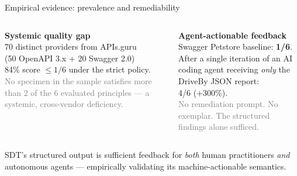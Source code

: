 \documentclass[11pt,aspectratio=169]{beamer}
\begin{document}
\begin{frame}{Empirical evidence: prevalence and remediability}

\begin{columns}[T,onlytextwidth]

\textbf{\textcolor{sdtblue}{Systemic quality gap}}\\[0.4em]
\footnotesize
70 distinct providers from APIs.guru\\
(50 OpenAPI 3.x + 20 Swagger 2.0)\\[0.4em]
\alert{84\% score $\leq 1/6$ under the strict policy.}\\[0.4em]
\textcolor{gray}{No specimen in the sample satisfies more than 2 of the 6 evaluated principles --- a systemic, cross-vendor deficiency.}

\textbf{\textcolor{sdtgreen}{Agent-actionable feedback}}\\[0.4em]
\footnotesize
Swagger Petstore baseline: \textbf{1/6}.\\
After a single iteration of an AI coding agent receiving \emph{only} the DriveBy JSON report:\\[0.4em]
\alert{4/6 ($+$300\%).}\\[0.4em]
\textcolor{gray}{No remediation prompt. No exemplar. The structured findings alone sufficed.}

\end{columns}

\vspace{1em}
\begin{center}
\footnotesize SDT's structured output is sufficient feedback for
\emph{both} human practitioners \emph{and} autonomous agents ---
empirically validating its machine-actionable semantics.
\end{center}

\end{frame}
\end{document}
